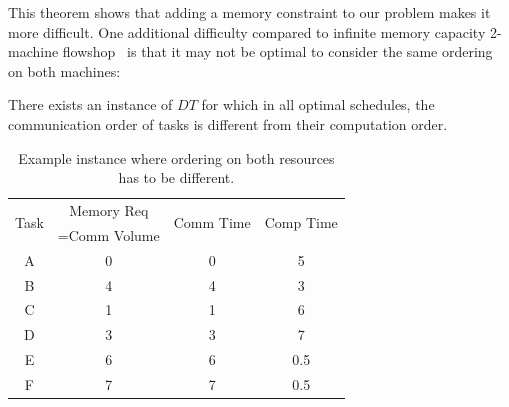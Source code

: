 \documentclass[runningheads]{llncs} %
\begin{document}


This theorem shows that adding a memory constraint to our
problem makes it more difficult. One additional difficulty
compared to infinite memory capacity 2-machine flowshop~\cite{johnson} is that
it may not be optimal to consider the same ordering on both
machines:

	\begin{proposition}
	There exists an instance of $DT$ for which in all optimal
	schedules, the communication order of tasks is different
	from their computation order.
\end{proposition}

\begin{table}
	\begin{center}
		\begin{tabular}{|c|c|c|c|}
			\hline
			\multirow{2}{*}{Task} & Memory Req & \multirow{2}{*}{Comm Time} & \multirow{2}{*}{Comp Time}\\  
			&=Comm Volume && \\ \hline
			A & 0 & 0 & 5\\ \hline
			B & 4 & 4 & 3\\ \hline
			C & 1 & 1 & 6\\ \hline
			D & 3 & 3 & 7\\ \hline
			E & 6 & 6 & 0.5\\ \hline
			F & 7 & 7 & 0.5\\ \hline
		\end{tabular}
	\end{center}
	\caption{Example instance where ordering on both resources
		has to be different.}
	\label{table:different.order}
\end{table}
\end{document}
